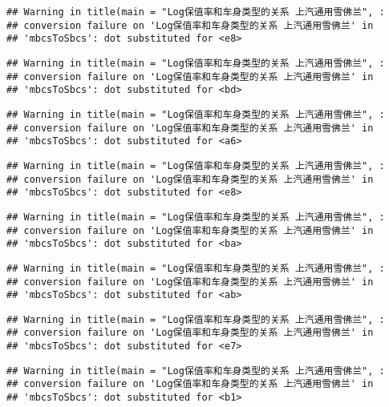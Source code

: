 \documentclass[]{article}
\begin{document}
\begin{verbatim}
## Warning in title(main = "Log保值率和车身类型的关系 上汽通用雪佛兰", :
## conversion failure on 'Log保值率和车身类型的关系 上汽通用雪佛兰' in
## 'mbcsToSbcs': dot substituted for <e8>
\end{verbatim}

\begin{verbatim}
## Warning in title(main = "Log保值率和车身类型的关系 上汽通用雪佛兰", :
## conversion failure on 'Log保值率和车身类型的关系 上汽通用雪佛兰' in
## 'mbcsToSbcs': dot substituted for <bd>
\end{verbatim}

\begin{verbatim}
## Warning in title(main = "Log保值率和车身类型的关系 上汽通用雪佛兰", :
## conversion failure on 'Log保值率和车身类型的关系 上汽通用雪佛兰' in
## 'mbcsToSbcs': dot substituted for <a6>
\end{verbatim}

\begin{verbatim}
## Warning in title(main = "Log保值率和车身类型的关系 上汽通用雪佛兰", :
## conversion failure on 'Log保值率和车身类型的关系 上汽通用雪佛兰' in
## 'mbcsToSbcs': dot substituted for <e8>
\end{verbatim}

\begin{verbatim}
## Warning in title(main = "Log保值率和车身类型的关系 上汽通用雪佛兰", :
## conversion failure on 'Log保值率和车身类型的关系 上汽通用雪佛兰' in
## 'mbcsToSbcs': dot substituted for <ba>
\end{verbatim}

\begin{verbatim}
## Warning in title(main = "Log保值率和车身类型的关系 上汽通用雪佛兰", :
## conversion failure on 'Log保值率和车身类型的关系 上汽通用雪佛兰' in
## 'mbcsToSbcs': dot substituted for <ab>
\end{verbatim}

\begin{verbatim}
## Warning in title(main = "Log保值率和车身类型的关系 上汽通用雪佛兰", :
## conversion failure on 'Log保值率和车身类型的关系 上汽通用雪佛兰' in
## 'mbcsToSbcs': dot substituted for <e7>
\end{verbatim}

\begin{verbatim}
## Warning in title(main = "Log保值率和车身类型的关系 上汽通用雪佛兰", :
## conversion failure on 'Log保值率和车身类型的关系 上汽通用雪佛兰' in
## 'mbcsToSbcs': dot substituted for <b1>
\end{verbatim}
\end{document}
